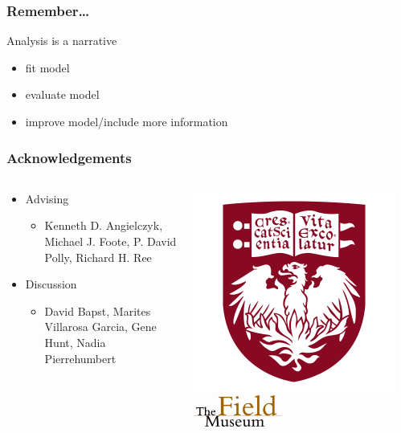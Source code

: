 \documentclass{beamer}
\begin{document}
\begin{frame}
  \frametitle{Remember\dots}
  Analysis is a narrative

  \bigskip

  \begin{itemize}
    \item fit model
    \item evaluate model
    \item improve model/include more information
  \end{itemize}
\end{frame}


\begin{frame}
  \frametitle{Acknowledgements}
  \begin{columns}
    \begin{column}{0.4\textwidth}
      \begin{itemize}
        \item Advising
          \begin{itemize}
            \item Kenneth D. Angielczyk, Michael J. Foote, P. David Polly, Richard H. Ree
          \end{itemize}

        \item Discussion 
          \begin{itemize}
            \item David Bapst, Marites Villarosa Garcia, Gene Hunt, Nadia Pierrehumbert
          \end{itemize}
      \end{itemize}
    \end{column}
    \begin{column}{0.6\textwidth}
      \includegraphics[height = 0.3\textheight, keepaspectratio = true]{figure/chicago} 
      \includegraphics[width = 0.4\textwidth, keepaspectratio = true]{figure/field}


\end{column}
\end{columns}
\end{frame}
\end{document}
